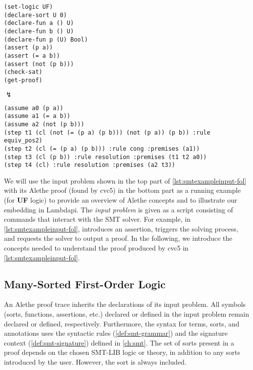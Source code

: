 \begin{lstlisting}[language=SMT]
(set-logic UF)
(declare-sort U 0)
(declare-fun a () U)
(declare-fun b () U)
(declare-fun p (U) Bool)
(assert (p a))
(assert (= a b))
(assert (not (p b)))
(check-sat)
(get-proof)
\end{lstlisting}

\begin{center}
$\lightning$
\end{center}

\begin{lstlisting}[language=SMT,caption={Running example: an SMT problem and its Alethe proof found by cvc5.},label={lst:smtexampleinput-fol}]
(assume a0 (p a))
(assume a1 (= a b))
(assume a2 (not (p b)))
(step t1 (cl (not (= (p a) (p b))) (not (p a)) (p b)) :rule equiv_pos2)
(step t2 (cl (= (p a) (p b))) :rule cong :premises (a1))
(step t3 (cl (p b)) :rule resolution :premises (t1 t2 a0))
(step t4 (cl) :rule resolution :premises (a2 t3))
\end{lstlisting}


We will use the input problem shown in the top part of \cref{lst:smtexampleinput-fol} with its Alethe proof (found by cvc5) in the bottom part as a running example (for \textbf{UF} logic) to provide an overview of Alethe concepts and to illustrate our embedding in Lambdapi.
The \emph{input problem} is given as a script consisting of commands that interact with the SMT solver.
For example, in \cref{lst:smtexampleinput-fol},  introduces an assertion,  triggers the solving process, and  requests the solver to output a proof.
In the following, we introduce the concepts needed to understand the proof produced by cvc5 in \cref{lst:smtexampleinput-fol}.

\subsection{Many-Sorted First-Order Logic}

An Alethe proof trace inherits the declarations of its input problem. All symbols (sorts, functions, assertions, etc.) declared or defined in the input problem remain declared or defined, respectively.
Furthermore, the syntax for terms, sorts, and annotations uses the syntactic rules (\cref{def:smt-grammar}) and the signature context (\cref{def:smt-signature}) defined in \cref{ch:smt}.
The set of sorts present in a proof depends on the chosen SMT-LIB logic or theory, in addition to any sorts introduced by the user.
However, the sort  is always included.

